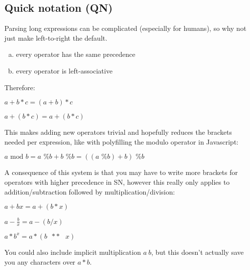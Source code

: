 \documentclass[twoside]{article}
\newcommand{\M}[1]{\scriptstyle{#1}} %
\newcommand{\T}[1]{\textrm{#1}} %
\newcommand{\F}[2]{\frac{#1}{#2}} %
\newcommand{\percent}{\T{ \% }}
\newcommand{\pow}{\T{ }\M{**}\T{ }}
\begin{document}
\begin{multicols*}{2}
        \section{Quick notation (QN)}
            Parsing long expressions can be complicated (especially for humans),
            so why not just make left-to-right the default.
            \begin{enumerate}[a)]
                \item every operator has the same precedence
                \item every operator is left-associative
            \end{enumerate}
            \par\vspace{2px}
                Therefore:\vspace{2px}\\
                \centerline{$ a + b * c = (a + b) * c $}
                \centerline{$ a + (b * c) = a + (b * c) $}\vspace{-1px}
            \par\vspace{5px}
                This makes adding new operators trivial
                and hopefully reduces the brackets needed per expression,
                like with polyfilling the modulo operator in Javascript:\vspace{4px}\\
                \centerline{$ a \T{ mod } b = a \percent b + b \percent b = ((a \percent b) + b) \percent b $}
            \par\vspace{5px}
                A consequence of this system is that
                you may have to write more brackets for operators with higher precedence in SN,
                however this really only applies to addition/subtraction followed by multiplication/division:\vspace{2px}\\
                \centerline{$ a + bx = a + (b*x) $}
                \centerline{$ a - \F{b}{x} = a - (b/x) $}
                \centerline{$ a * b^x = a * (b \pow x) $}
            \centerline{}
                You could also include implicit multiplication $a\ b$,
                but this doesn't actually save you any characters over $a*b$.
    \end{multicols*}
\end{document}

